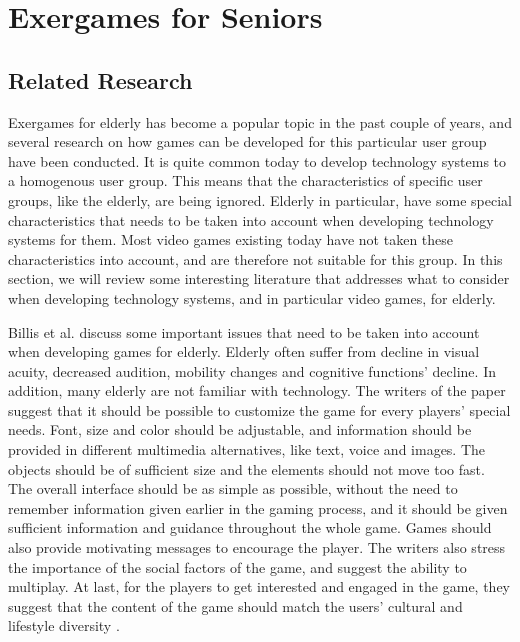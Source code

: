 \chapter{Exergames for Seniors}
\label{chap:exforseniors}

\section{Related Research}
Exergames for elderly has become a popular topic in the past couple of years, and several research on how games can be developed for this particular user group have been conducted. It is quite common today to develop technology systems to a homogenous user group. This means that the characteristics of specific user groups, like the elderly, are being ignored. Elderly in particular, have some special characteristics that needs to be taken into account when developing technology systems for them. Most video games existing today have not taken these characteristics into account, and are therefore not suitable for this group. In this section, we will review some interesting literature that addresses what to consider when developing technology systems, and in particular video games, for elderly.  

Billis et al. \cite{Billis} discuss some important issues that need to be taken into account when developing games for elderly. Elderly often suffer from decline in visual acuity, decreased audition, mobility changes and cognitive functions' decline. In addition, many elderly are not familiar with technology. The writers of the paper suggest that it should be possible to customize the game for every players' special needs. Font, size and color should be adjustable, and information should be provided in different multimedia alternatives, like text, voice and images. The objects should be of sufficient size and the elements should not move too fast. The overall interface should be as simple as possible, without the need to remember information given earlier in the gaming process, and it should be given sufficient information and guidance throughout the whole game. Games should also provide motivating messages to encourage the player. The writers also stress the importance of the social factors of the game, and suggest the ability to multiplay. At last, for the players to get interested and engaged in the game, they suggest that the content of the game should match the users' cultural and lifestyle diversity \cite{Billis}.


